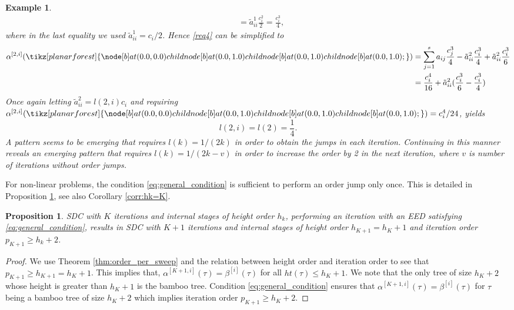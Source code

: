 \documentclass[sn-mathphys-num]{sn-jnl}%
\newcommand{\forestFE}{
\tikz[planar forest] {

\node [b] at (0.0, 0.0) {  } 
child {node [b] at (0.0, 1.0) {  }  
child {node [b] at (0.0, 1.0) {  }  
child {node [b] at (0.0, 1.0) {  }  
}
}
}
;
}}
\newcommand{\forestGE}{
\tikz[planar forest] {

\node [b] at (0.0, 0.0) {  } 
child {node [b] at (0.0, 1.0) {  }  
child {node [b] at (0.0, 1.0) {  }  
child {node [b] at (0.0, 1.0) {  }  
}
}
}
;
}}
\newcommand{\reva}[1]{#1}%
\theoremstyle{thmstyleone}%
\newtheorem{proposition}[theorem]{Proposition}%
\theoremstyle{thmstyletwo}%
\newtheorem{example}{Example}%
\theoremstyle{thmstylethree}%
\begin{document}
\begin{example}
\begin{align*}
	 &= \tilde{a}_{ii}^{1} \frac{c_i^2}{2} = \frac{c_i^3}{4},
\end{align*}
where in the last equality we used $\tilde{a}_{ii}^{1} = c_i/2$. Hence \eqref{req4} can be simplified to 
\begin{align*}
	\alpha^{[2, i]}(\forestFE) &= \sum_{j=1}^s a_{ij}\frac{c_j^3}{4} - \tilde{a}_{ii}^{2} \frac{c_i^3}{4} + \tilde{a}_{ii}^{2} \frac{c_i^3}{6} \\
				&= \frac{c_i^4}{16} + \tilde{a}_{ii}^{2}(\frac{c_i^3}{6} - \frac{c_i^3}{4})
\end{align*}
Once again letting $\tilde{a}_{ii}^{2} = l(2,i)c_i$ and \reva{requiring $\alpha^{[2, i]}(\forestGE) = c_i^4/24$}, yields
\begin{equation*}
	l(2,i) = l(2) = \frac{1}{4}.
\end{equation*}
A pattern seems to be emerging that requires $l(k)=1/(2k)$ in order to obtain the jumps in each iteration.
Continuing in this manner reveals an emerging pattern that requires $l(k)=1/(2k-v)$ in order to increase the order by 2 in the next iteration, where $v$ is number of iterations without order jumps.
\end{example}



For non-linear problems, the condition \eqref{eq:general_condition} is sufficient to perform an order jump only once. This is detailed in Proposition \ref{prop:single_order_jump}, see also Corollary \ref{corr:hk=K}.
\begin{proposition}
    \label{prop:single_order_jump}
    SDC with $K$ iterations and internal stages of height order $h_k$, performing an iteration with an EED satisfying \eqref{eq:general_condition}, results in SDC with $K+1$ iterations and internal stages of height order $h_{K+1} = h_K + 1$ and \reva{iteration} order $p_{K+1} \geq h_k + 2$.
\end{proposition}
\begin{proof}
    We use Theorem \ref{thm:order_per_sweep} and the relation between h\reva{e}ight order and \reva{iteration} order to see that $p_{K+1} \geq h_{K+1} = h_K + 1$. This implies that, $\alpha^{[K+1,i]} (\tau) = \beta^{[i]} (\tau)$ for all $ht(\tau) \leq h_K + 1$. We note that the only tree of size $h_K + 2$ whose height is greater than $h_K + 1$ is the bamboo tree. Condition \eqref{eq:general_condition} ensures that $\alpha^{[K+1,i]} (\tau) = \beta^{[i]} (\tau)$ for $\tau$ being a bamboo tree of size $h_K + 2$ which implies \reva{iteration} order $p_{K+1} \geq h_K + 2$.
\end{proof}
\end{document}
